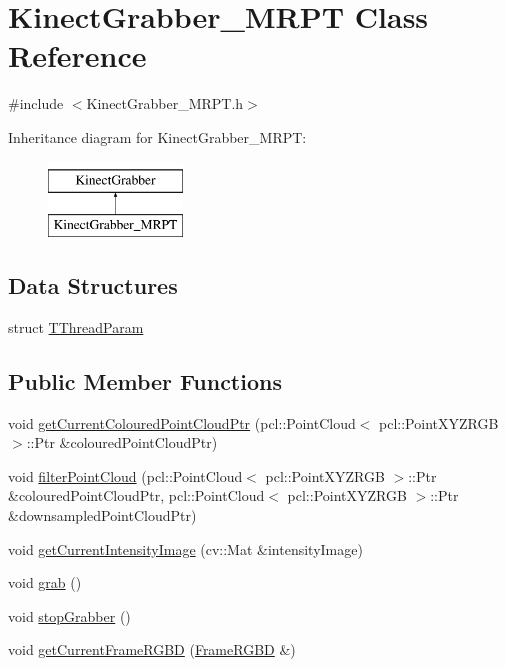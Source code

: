 \hypertarget{class_kinect_grabber___m_r_p_t}{
\section{KinectGrabber\_\-MRPT Class Reference}
\label{class_kinect_grabber___m_r_p_t}
}


{\ttfamily \#include $<$KinectGrabber\_\-MRPT.h$>$}

Inheritance diagram for KinectGrabber\_\-MRPT:\begin{figure}[H]
\begin{center}
\leavevmode
\includegraphics[height=2.000000cm]{class_kinect_grabber___m_r_p_t}
\end{center}
\end{figure}
\subsection*{Data Structures}
\begin{DoxyCompactItemize}
\item 
struct \hyperlink{struct_kinect_grabber___m_r_p_t_1_1_t_thread_param}{TThreadParam}
\end{DoxyCompactItemize}
\subsection*{Public Member Functions}
\begin{DoxyCompactItemize}
\item 
void \hyperlink{class_kinect_grabber___m_r_p_t_a11aee26f0e640ca8b43f629b838a43a9}{getCurrentColouredPointCloudPtr} (pcl::PointCloud$<$ pcl::PointXYZRGB $>$::Ptr \&colouredPointCloudPtr)
\item 
void \hyperlink{class_kinect_grabber___m_r_p_t_acd8b9e162fa31c4f1940fbea6bdd9669}{filterPointCloud} (pcl::PointCloud$<$ pcl::PointXYZRGB $>$::Ptr \&colouredPointCloudPtr, pcl::PointCloud$<$ pcl::PointXYZRGB $>$::Ptr \&downsampledPointCloudPtr)
\item 
void \hyperlink{class_kinect_grabber___m_r_p_t_adf243a3557ff0347c7eee98c0c2a309b}{getCurrentIntensityImage} (cv::Mat \&intensityImage)
\item 
void \hyperlink{class_kinect_grabber___m_r_p_t_ac5997c6197eed0f9bd0977f45a5d5928}{grab} ()
\item 
void \hyperlink{class_kinect_grabber___m_r_p_t_a9fee110b324eab5a7e852509643a101f}{stopGrabber} ()
\item 
void \hyperlink{class_kinect_grabber___m_r_p_t_a64ec507059096493aa6c1c172b31b651}{getCurrentFrameRGBD} (\hyperlink{class_frame_r_g_b_d}{FrameRGBD} \&)
\end{DoxyCompactItemize}
